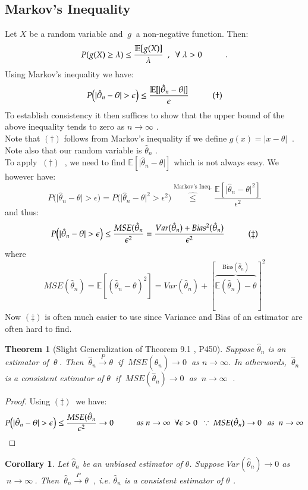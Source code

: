 \documentclass[14pt,twoside,a4paper,fleqn]{article}
\theoremstyle{plain}
\newtheorem{corollary}{Corollary}[section]
\newtheorem*{theorem*}{Theorem}
\begin{document}
\subsection{Markov's Inequality}
Let $X$ be a random variable and $\ g \ $ a non-negative function. Then:
$$
	P(g(X) \geq \lambda) \leq \frac{\mathbb{E}[g(X)]}{\lambda} \ \ ,\ \ \forall\ \lambda>0\tab .
$$
Using Markov's inequality we have:
$$
	P\big(\vert\hat{\theta}_n - \theta\vert > \epsilon\big) \leq \frac{\mathbb{E}[\vert\hat{\theta}_n - \theta\vert]}{\epsilon}\hspace*{1cm} (\dagger)
$$
To establish consistency it then suffices to show that the upper bound of the above inequality tends to zero as $n\to\infty$ .\\
Note that $(\dagger)$ follows from Markov's inequality if we define \mbox{$g(x)=\vert x-\theta\vert\ $} . Note also that our random variable is $\hat{\theta}_n$ .\\
To apply $\ (\dagger) \ $ , we need to find $\mathbb{E}[\vert\hat{\theta}_n - \theta\vert]$ which is not always easy. We however have:
$$
	P\big(\vert\hat{\theta}_n - \theta \vert > \epsilon\big) = P\big(\vert\hat{\theta}_n - \theta \vert^2 > \epsilon^2 \big) \overbrace{\leq}^{\text{Markov's Ineq.}} \frac{\mathbb{E}[\vert\hat{\theta}_n - \theta\vert^2]}{\epsilon^2}
$$
and thus:
$$
	P\big(\vert\hat{\theta}_n - \theta \vert > \epsilon \big) \leq \frac{MSE(\hat{\theta}_n}{\epsilon^2} = \frac{Var(\hat{\theta}_n) + Bias^2(\hat{\theta}_n)}{\epsilon^2}\hspace*{1cm} (\ddagger)
$$
where
$$
	MSE(\hat{\theta}_n) = \mathbb{E}[(\hat{\theta}_n
-\theta)^2] = Var(\hat{\theta}_n) + [\overbrace{\mathbb{E}(\hat{\theta}_n) - \theta}^{\text{Bias}(\hat{\theta}_n)}]^2
$$
Now $(\ddagger)$ is often much easier to use since Variance and Bias of an estimator are often hard to find.
\begin{theorem*}[Slight Generalization of Theorem 9.1 , P450]
Suppose $\hat{\theta}_n$ is an estimator of $\ \theta\ $. Then $\ \hat{\theta}_n \xrightarrow{P}\theta\ $ if \mbox{$\ MSE(\hat{\theta}_n) \to 0\ $} as $n\to\infty$. In otherwords, $\ \hat{\theta}_n$ is a consistent estimator of $\theta\ $ if $\ MSE(\hat{\theta}_n)\to 0\ $ as $\ n\to\infty \ $ .
\end{theorem*} 
\begin{proof}
Using $(\ddagger)\ $ we have:
$$
	P\big(\vert \hat{\theta}_n - \theta \vert > \epsilon\big) \leq \frac{MSE(\hat{\theta}_n}{\epsilon^2}\to 0\tab as\ n\to\infty\ \ \forall \epsilon>0\ \ \because\ MSE(\hat{\theta}_n)\to 0\ \ \ as\ \ n\to\infty
$$
\end{proof}
\begin{corollary}
Let $\hat{\theta}_n$ be an unbiased estimator of $\theta$. Suppose $Var(\hat{\theta}_n)\to 0$ as $\ n\to\infty\ $. Then $\ \hat{\theta}_n\xrightarrow{P}\theta\ $ , i.e. $\hat{\theta}_n$ is a consistent estimator of $\theta$ .
\end{corollary}
\end{document}
